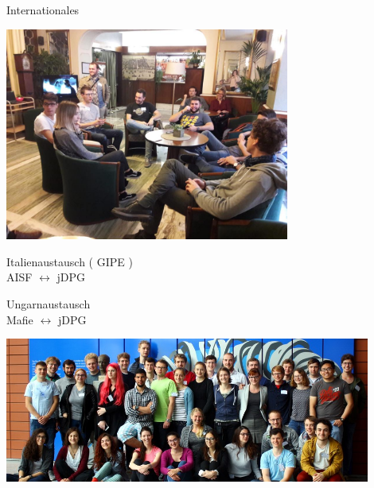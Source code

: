 \documentclass[
]{beamer}
\begin{document}
\begin{frame}{Internationales}
  \begin{minipage}{0.6\textwidth}
    \begin{flushleft}
      \includegraphics[width=0.7\textwidth]{figure/gipe_2018}
    \end{flushleft}
  \end{minipage}
  \begin{minipage}{0.38\textwidth}
    \begin{center}
      Italienaustausch ( GIPE ) \\ AISF $\leftrightarrow$ jDPG
    \end{center}
  \end{minipage}
  
  \vfill

  \begin{minipage}{0.38\textwidth}
    \begin{center}
      Ungarnaustausch \\ Mafie $\leftrightarrow$ jDPG
    \end{center}
  \end{minipage}
  \begin{minipage}{0.6\textwidth}
    \begin{flushleft}
      \includegraphics[width=0.9\textwidth]{figure/mafie_2017}
    \end{flushleft}
  \end{minipage}

\end{frame}
\end{document}
